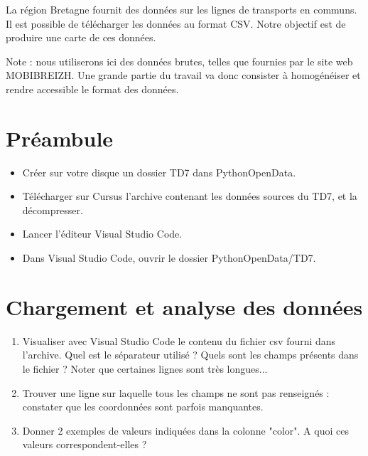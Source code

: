 \documentclass[11pt,a4paper]{article}
\begin{document}
La région Bretagne fournit des données sur les lignes de transports en communs.
Il est possible de télécharger les données au format CSV. 
Notre objectif est de produire une carte de ces données.

Note : nous utiliserons ici des données brutes, telles que fournies par le site web MOBIBREIZH.
Une grande partie du travail va donc consister à homogénéiser et rendre accessible le format des données. 


\section*{Préambule}
\begin{itemize}
    \item Créer sur votre disque un dossier TD7 dans PythonOpenData. 
    \item Télécharger sur Cursus l'archive contenant les données sources du TD7, et la décompresser.
    \item Lancer l'éditeur Visual Studio Code.
    \item Dans Visual Studio Code, ouvrir le dossier PythonOpenData/TD7. 
\end{itemize}



\section{Chargement et analyse des données}

\begin{enumerate}
    \item Visualiser avec Visual Studio Code le contenu du fichier csv fourni dans l'archive. Quel est le séparateur utilisé ? Quels sont les champs présents dans le fichier ? Noter que certaines lignes sont très longues...
    \item Trouver une ligne sur laquelle tous les champs ne sont pas renseignés : constater que les coordonnées sont parfois manquantes.
    \item Donner 2 exemples de valeurs indiquées dans la colonne "color". A quoi ces valeurs correspondent-elles ?
\end{enumerate}
\end{document}
